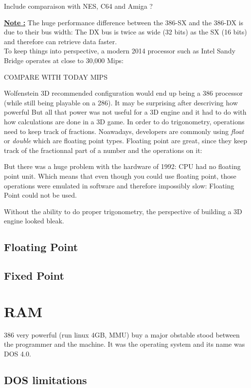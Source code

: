 \documentclass[book.tex]{subfiles}
\begin{document}
Include comparaison with NES, C64 and Amiga  ?
 
 \textbf{\underline{Note :}} The huge performance difference between the 386-SX and the 386-DX is due to their bus width: The DX bus is twice as wide (32 bits) as the SX (16 bits) and therefore can retrieve data faster.
 \\

To keep things into perspective, a modern 2014 processor such as Intel Sandy Bridge operates at close to 30,000 Mips:

COMPARE WITH TODAY MIPS

  Wolfenstein 3D recommended configuration would end up being a 386 processor (while still being playable on a 286). It may be surprising after descriving how powerful
  But all that power was not useful for a 3D engine and it had to do with how calculations are done in a 3D game. In order to do trigonometry, operations need
  to keep track of fractions. Noawadays, developers are commonly using \emph{float} or 
  \emph{double} which are floating point types. Floating point are great, since they keep track of the fractionnal part of a number and the operations on it:


  But there was a huge problem with the hardware of 1992: CPU had no floating point unit. Which means that even though you could use floating point, those operations were emulated in software and therefore impossibly slow: Floating Point could not be used.

  Without the ability to do proper trigonometry, the perspective of building a 3D engine looked bleak.

  \subsection{Floating Point}
  \subsection{Fixed Point}

\section{RAM}
  386 very powerful (run linux 4GB, MMU) buy a major obstable stood between the programmer and the machine. It was the operating system and its name was DOS 4.0.
  \\
  \subsection{DOS limitations}
\end{document}
